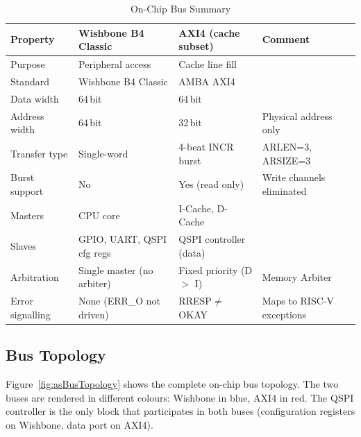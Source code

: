 \begin{table}[H]
\caption{On-Chip Bus Summary}
\label{tab:asDualBus}
\centering
\begin{tabularx}{\textwidth}{|l |X |X |X|}
  \hline
  Property          & Wishbone B4 Classic         & AXI4 (cache subset)      & Comment \\
  \hline
  \hline
  Purpose           & Peripheral access           & Cache line fill          & \\
  \hline
  Standard          & Wishbone B4 Classic         & AMBA AXI4                & \\
  \hline
  Data width        & 64\,bit                     & 64\,bit                  & \\
  \hline
  Address width     & 64\,bit                     & 32\,bit                  & Physical address only \\
  \hline
  Transfer type     & Single-word                 & 4-beat INCR burst        & ARLEN=3, ARSIZE=3 \\
  \hline
  Burst support     & No                          & Yes (read only)          & Write channels eliminated \\
  \hline
  Masters           & CPU core                    & I-Cache, D-Cache         & \\
  \hline
  Slaves            & GPIO, UART, QSPI cfg regs   & QSPI controller (data)   & \\
  \hline
  Arbitration       & Single master (no arbiter)  & Fixed priority (D $>$ I) & Memory Arbiter \\
  \hline
  Error signalling  & None (ERR\_O not driven)    & RRESP$\neq$OKAY          & Maps to RISC-V exceptions \\
  \hline
\end{tabularx}
\end{table}

\subsection{Bus Topology}
\label{subsec:asBusTopology}

Figure~\ref{fig:asBusTopology} shows the complete on-chip bus topology.
The two buses are rendered in different colours: Wishbone in blue,
AXI4 in red.
The QSPI controller is the only block that participates in both buses
(configuration registers on Wishbone, data port on AXI4).

